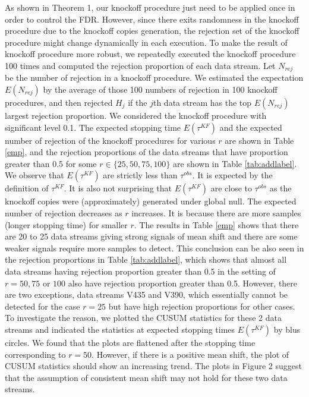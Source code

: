 \documentclass[]{interact}
\theoremstyle{plain}%
\theoremstyle{definition}
\theoremstyle{remark}
\begin{document}
As shown in Theorem 1, our knockoff procedure just need to be applied once in order to control the FDR. However, since there exits randomness in the knockoff procedure due to the knockoff copies generation, the rejection set of the knockoff procedure might change dynamically in each execution. To make the result of knockoff procedure more robust, we repeatedly executed the knockoff procedure 100 times and computed the rejection proportion of each data stream. Let $N_{rej}$ be the number of rejection in a knockoff procedure. We estimated the expectation $E(N_{rej})$ by the average of those 100 numbers of rejection in 100 knockoff procedures, and then rejected $H_j$ if the $j$th data stream has the top $E(N_{rej})$ largest rejection proportion. We considered the knockoff procedure with significant level 0.1. The expected stopping time $E(\tau^{KF})$ and the expected number of rejection of the knockoff procedures for various $r$ are shown in Table \ref{emp}, and the rejection proportions of the data streams that have proportion greater than 0.5 for some $r\in\{25,50,75,100\}$ are shown in Table \ref{tab:addlabel}. We observe that $E(\tau^{KF})$ are strictly less than $\tau^{obs}$. It is expected by the definition of $\tau^{KF}$. It is also not surprising that $E(\tau^{KF})$ are close to $\tau^{obs}$ as the knockoff copies were (approximately) generated under global null. The expected number of rejection decreases as $r$ increases. It is because there are more samples (longer stopping time) for smaller $r$. The results in Table \ref{emp} shows that there are 20 to 25 data streams giving strong signals of mean shift and there are some weaker signals require more samples to detect. This conclusion can be also seen in the rejection proportions in Table \ref{tab:addlabel}, which shows that almost all data streams having rejection proportion greater than 0.5 in the setting of $r=50,75$ or $100$ also have rejection proportion greater than 0.5. However, there are two exceptions, data streams V435 and V390, which essentially cannot be detected for the case $r=25$ but have high rejection proportions for other cases. To investigate the reason, we plotted the CUSUM statistics for these 2 data streams and indicated the statistics at expected stopping times $E(\tau^{KF})$ by blus circles. We found that the plots are flattened after the stopping time corresponding to $r=50$. However, if there is a positive mean shift, the plot of CUSUM statistics should show an increasing trend. The plots in Figure 2 suggest that the assumption of consistent mean shift may not hold for these two data streams.   
\end{document}
